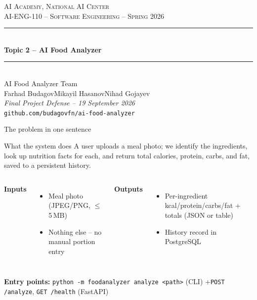 \documentclass[aspectratio=169,11pt]{beamer}
\newcommand{\teamname}{AI Food Analyzer Team}
\newcommand{\topicchoice}{Topic 2 -- AI Food Analyzer}
\newcommand{\memberone}{Farhad Budagov}
\newcommand{\membertwo}{Mikayil Hasanov}
\newcommand{\memberthree}{Nihad Gojayev}
\newcommand{\repolink}{github.com/budagovfn/ai-food-analyzer}
\newcommand{\coursecode}{AI-ENG-110}
\newcommand{\coursename}{Software Engineering}
\newcommand{\institution}{AI Academy, National AI Center}
\newcommand{\semester}{Spring 2026}
\begin{document}
{%
\begin{frame}[plain]
  \begin{center}
    \vspace{0.6cm}
    {\small \textsc{\institution}}\\[0.2em]
    {\small \textsc{\coursecode{} -- \coursename{} -- \semester{}}}\\[1.2em]
    \rule{0.7\textwidth}{0.6pt}\\[0.4em]
    {\Huge\bfseries\color{accent} \topicchoice}\\[0.4em]
    \rule{0.7\textwidth}{0.6pt}\\[1.2em]
    {\large \teamname}\\[0.6em]
    {\normalsize \memberone\quad\textbullet\quad\membertwo\quad\textbullet\quad\memberthree}\\[1cm]
    {\footnotesize\itshape Final Project Defense -- 19 September 2026}\\[0.4em]
    {\footnotesize\texttt{\repolink}}
  \end{center}
\end{frame}
}

\begin{frame}{The problem in one sentence}
  \begin{block}{What the system does}
    A user uploads a meal photo; we identify the ingredients, look up nutrition facts for each, and return total calories, protein, carbs, and fat, saved to a persistent history.
  \end{block}

  \vspace{0.3em}
  \begin{columns}[T,onlytextwidth]
  \textbf{Inputs}
  \begin{itemize}
    \item Meal photo (JPEG/PNG, $\le$5\,MB)
    \item Nothing else -- no manual portion entry
  \end{itemize}

  \textbf{Outputs}
  \begin{itemize}
    \item Per-ingredient kcal/protein/carbs/fat + totals (JSON or table)
    \item History record in PostgreSQL
  \end{itemize}
  \end{columns}

  \vspace{0.4em}
  \textbf{Entry points:} \texttt{python -m foodanalyzer analyze <path>} (CLI) \quad+\quad \texttt{POST /analyze}, \texttt{GET /health} (FastAPI)
\end{frame}
\end{document}
